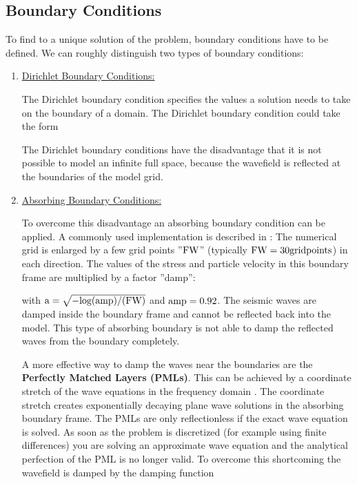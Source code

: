 \documentclass[11pt,onecolumn,oneside]{article}
\begin{document}
\newpage

\subsection{Boundary Conditions}\label{bound_cond}
To find to a unique solution of the problem, boundary conditions have to be defined. We can roughly distinguish two types of boundary conditions:

\begin{enumerate}

\item \underline{Dirichlet Boundary Conditions:}

The Dirichlet boundary condition specifies the values a solution needs to take on the boundary of a domain.
The Dirichlet boundary condition could take the form


The Dirichlet boundary conditions have the disadvantage that it is not possible to model an infinite full space, because the wavefield is reflected at the boundaries of the model grid.

\item \underline{Absorbing Boundary Conditions:}

To overcome this disadvantage an absorbing boundary condition can be applied. A commonly used implementation is described in \cite{cerjan:85}: The numerical grid is enlarged by a few grid points ''$\rm{FW}$'' (typically $\rm{FW=30 gridpoints}$) in each direction. The values of the stress and particle velocity in this boundary frame are multiplied by a factor ''damp'':


with $\rm{a=\sqrt{-log(amp)/(FW)}}$ and $\rm{amp=0.92}$. The seismic waves are damped inside the boundary frame and cannot be reflected back into the model. This type of absorbing boundary
is not able to damp the reflected waves from the boundary completely.

A more effective way to damp the waves near the boundaries are the {\bf{Perfectly Matched Layers (PMLs)}}. This can be achieved by a coordinate stretch of the wave equations in the frequency domain \cite{komatitsch:07}. The coordinate stretch creates exponentially decaying plane wave solutions in the absorbing boundary frame. The PMLs are only reflectionless if the exact wave equation is solved. As soon as the problem is discretized (for example using finite differences) you are solving an approximate wave equation and the analytical perfection of the PML is no longer valid. To overcome this shortcoming the wavefield is damped by the damping function 


\end{enumerate}
\end{document}
